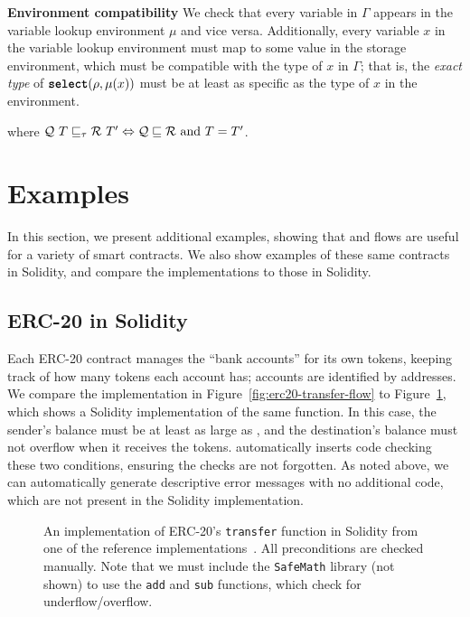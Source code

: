\documentclass[nonacm, dvipsnames, sigconf]{acmart}
\begin{document}
\framebox{$\Gamma \compat \Sigma$} \textbf{Environment compatibility}
We check that every variable in $\Gamma$ appears in the variable lookup environment $\mu$ and vice versa.
Additionally, every variable $x$ in the variable lookup environment must map to some value in the storage environment, which must be compatible with the type of $x$ in $\Gamma$; that is, the \emph{exact type} of $\select(\rho, \mu(x))$ must be at least as specific as the type of $x$ in the environment.

\begin{mathpar}
\end{mathpar}

where $\mathcal{Q}~T \sqsubseteq_{\tau} \mathcal{R}~T' \iff \mathcal{Q} \sqsubseteq \mathcal{R} \tand T = T'$.

\section{Examples}

In this section, we present additional examples, showing that \langName and flows are useful for a variety of smart contracts.
We also show examples of these same contracts in Solidity, and compare the \langName implementations to those in Solidity.

\subsection{ERC-20 in Solidity}\label{sec:erc20-impl}
Each ERC-20 contract manages the ``bank accounts'' for its own tokens, keeping track of how many tokens each account has; accounts are identified by addresses.
We compare the \langName implementation in Figure~\ref{fig:erc20-transfer-flow} to Figure~\ref{fig:erc20-transfer-sol}, which shows a Solidity implementation of the same function.
In this case, the sender's balance must be at least as large as , and the destination's balance must not overflow when it receives the tokens.
\langName automatically inserts code checking these two conditions, ensuring the checks are not forgotten.
As noted above, we can automatically generate descriptive error messages with no additional code, which are not present in the Solidity implementation.
\begin{figure}
    \centering
    
    \caption{An implementation of ERC-20's \lstinline[language=Solidity]{transfer} function in Solidity from one of the reference implementations~\cite{erc20Consensys}.
        All preconditions are checked manually.
        Note that we must include the \lstinline[language=Solidity]{SafeMath} library (not shown) to use the \lstinline[language=Solidity]{add} and \lstinline[language=Solidity]{sub} functions, which check for underflow/overflow.}
    \label{fig:erc20-transfer-sol}
\end{figure}
\end{document}
